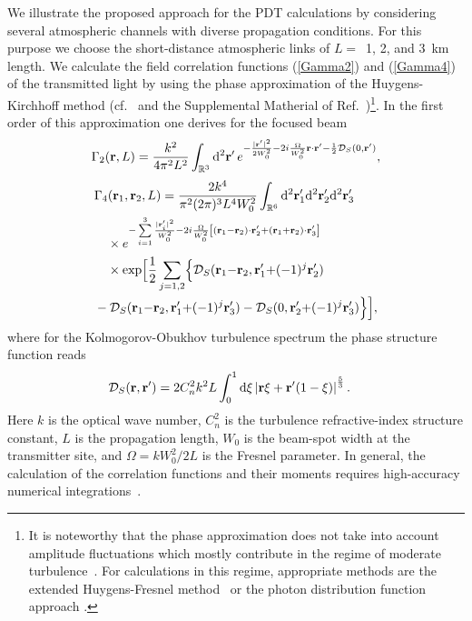\documentclass[aps,pra,twocolumn,a4paper,nofootinbib,preprintnumbers] {revtex4-1}
\newcommand{\D}{{\rm{d}}}
\begin{document}
	We illustrate the proposed approach for the PDT calculations by considering several atmospheric channels with diverse propagation conditions.
	For this purpose we choose the short-distance atmospheric links of $L{=}$~1, 2, and 3~km length.
	We calculate the field correlation functions (\ref{Gamma2}) and (\ref{Gamma4}) of the transmitted light by using the phase approximation of the  Huygens-Kirchhoff method (cf.~\cite{Banakh}  and the Supplemental Matherial of Ref.~\cite{Vasylyev2016})\footnote{
	It is noteworthy that the phase approximation does not take into account amplitude fluctuations which mostly contribute in the regime of moderate turbulence~\cite{Holmes}.
	For  calculations in this regime, appropriate methods are the extended Huygens-Fresnel method~\cite{Holmes} or the photon distribution function approach \cite{Chumak, Chumak1}.  }.
	In the first order of this approximation one derives for the focused beam
		\begin{align}\label{Gamma2Calc}
		\Gamma_2(\mathbf{r},L)=\frac{k^2}{4\pi^2L^2}\int_{\mathbb{R}^3}\D^2\mathbf{r}^\prime\,e^{-\frac{|\mathbf{r}^\prime|^2}{2W_0^2}
		-2i\frac{\Omega}{W_0^2}\mathbf{r}{\cdot}\mathbf{r}^\prime{-}\frac{1}{2}\mathcal{D}_S(0,\mathbf{r}^\prime)},
		\end{align}
		\begin{align}\label{Gamma4Calc}
		&\Gamma_4(\mathbf{r}_1,\mathbf{r}_2,L)=\frac{2k^4}{\pi^2(2\pi)^3L^4W_0^2}\int_{\mathbb{R}^6}\D^2\mathbf{r}_1^\prime
		\D^2\mathbf{r}_2^\prime\D^2\mathbf{r}_3^\prime\nonumber\\
		&\quad\times e^{-\sum\limits_{i=1}^3\frac{|\mathbf{r}_i^\prime|^2}{W_0^2}-2i\frac{\Omega}{W_0^2}\left[(\mathbf{r}_1
		{-}\mathbf{r}_2){\cdot}\mathbf{r}_2^\prime{+}(\mathbf{r}_1{+}\mathbf{r}_2){\cdot}\mathbf{r}_3^\prime\right]}\\
		&\quad\times\exp\Bigl[\frac{1}{2}\sum\limits_{j=1,2}\Bigl\{\mathcal{D}_S(\mathbf{r}_1{-}\mathbf{r}_2,
		\mathbf{r}_1^\prime{+}(-1)^j\mathbf{r}_2^\prime)\nonumber\\
		&-\mathcal{D}_S(\mathbf{r}_1{-}\mathbf{r}_2,\mathbf{r}_1^\prime{+}(-1)^j\mathbf{r}_3^\prime)-
		\mathcal{D}_S(0,\mathbf{r}_2^\prime{+}(-1)^j\mathbf{r}_3^\prime)\Bigr\}\Bigr],\nonumber
		\end{align}
	where for the  Kolmogorov-Obukhov turbulence spectrum   \cite{Tatarskii} the phase structure function reads 
		\begin{align}
		&\mathcal{D}_S(\mathbf{r},\mathbf{r}^\prime)=2C_n^2 k^2 L\int_0^1\D\xi\left|\mathbf{r}\xi+\mathbf{r}^\prime(1-\xi)\right|^{\frac{5}{3}}.
		\end{align}
	Here $k$ is the optical wave number,  $C_n^2$ is the turbulence refractive-index structure constant, $L$ is the propagation length, $W_0$ is the beam-spot width at the transmitter site, and $\Omega{=}kW_0^2/2L$ is the Fresnel parameter.
	In general, the calculation of the correlation functions and their moments requires high-accuracy numerical integrations~\cite{Chumak, Kravtsov, Jakeman}.
\end{document}
